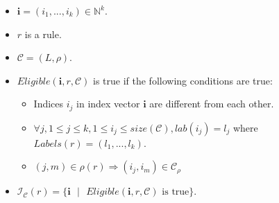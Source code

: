 \documentclass{article}
\newcommand{\s}{\text{ }}
\begin{document}
\begin{appendices}
\begin{enumerate}
\begin{itemize}
         \item $\bm{i} = (i_1,...,i_k) \in \mathbb{N}^k$.
         \item $r$ is a rule.
         \item $\mathcal{C} = (L,\rho)$.
         \item $Eligible(\bm{i},r,\mathcal{C})$ is true if the following conditions are true:
         \begin{itemize}
            \item Indices $i_j$ in index vector $\bm{i}$ are different from each other.
            \item $\forall j, 1 \leq j \leq k, 1 \leq i_j \leq size(\mathcal{C}), lab(i_j) = l_j$ where $Labels(r)= (l_1,...,l_k)$.
            \item $(j,m) \in \rho(r) \Rightarrow (i_j, i_m) \in \mathcal{C}_{\rho}$
         \end{itemize}
         \item $\mathcal{I}_{\mathcal{C}}(r) =\{\bm{i}\s |\s Eligible(\bm{i},r,\mathcal{C})\text{ is true}\}$.
         \end{itemize}
\end{enumerate}



\end{appendices}
\end{document}
